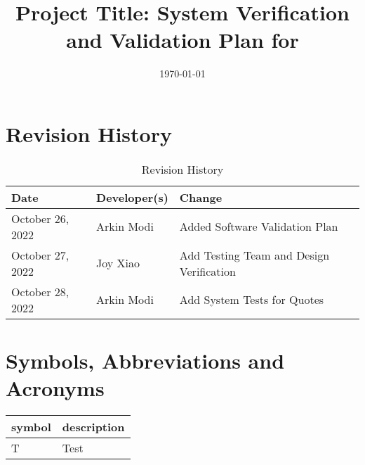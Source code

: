 \documentclass[12pt, titlepage]{article}
\begin{document}
\title{Project Title: System Verification and Validation Plan for \progname{}}
\author{\authname}
\date{\today}

\maketitle


\section{Revision History}

\begin{table}[hp]
	\caption{Revision History} \label{TblRevisionHistory}
	\begin{tabularx}{\textwidth}{llX}
		\toprule
		\textbf{Date}    & \textbf{Developer(s)} & \textbf{Change}                          \\
		\midrule
		October 26, 2022 & Arkin Modi            & Added Software Validation Plan           \\
		October 27, 2022 & Joy Xiao              & Add Testing Team and Design Verification \\
		October 28, 2022 & Arkin Modi            & Add System Tests for Quotes              \\
		\bottomrule
	\end{tabularx}
\end{table}

\newpage

\tableofcontents

\listoftables
{}

\listoffigures
{}

\newpage

\section{Symbols, Abbreviations and Acronyms}

\renewcommand{\arraystretch}{1.2}
\begin{tabular}{l l}
	\toprule
	\textbf{symbol} & \textbf{description} \\
	\midrule
	T               & Test                 \\
	\bottomrule
\end{tabular}\\

\end{document}
